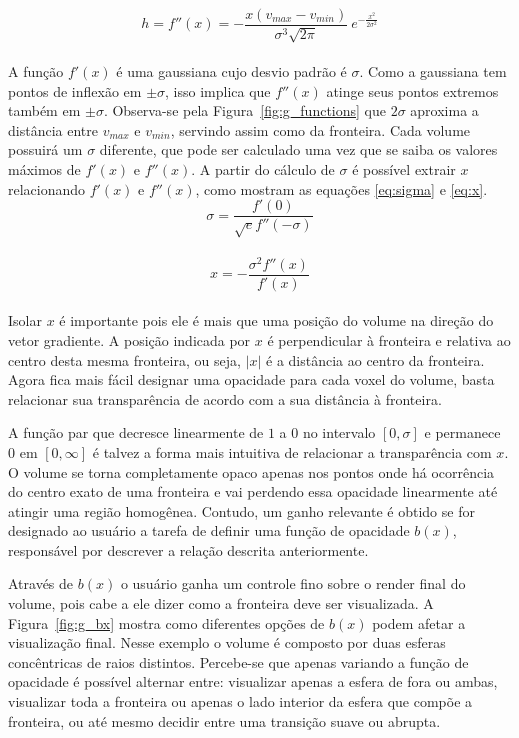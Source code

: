 \begin{equation} \label{eq:second}
	h = f''(x) = -\frac{x(v_{max} - v_{min})}{\sigma^{3}\sqrt{2\pi}}\ e^{-\frac{x^{2}}{2\sigma^{2}}}
\end{equation} \\

	A função $f'(x)$ é uma gaussiana cujo desvio padrão é $\sigma$. Como a gaussiana tem pontos de inflexão em $\pm\sigma$, isso implica que $f''(x)$ atinge seus pontos extremos também em $\pm\sigma$. Observa-se pela Figura~\ref{fig:g_functions} que $2\sigma$ aproxima a distância entre $v_{max}$ e $v_{min}$, servindo assim como  da fronteira. Cada volume possuirá um $\sigma$ diferente, que pode ser calculado uma vez que se saiba os valores máximos de $f'(x)$ e $f''(x)$. A partir do cálculo de $\sigma$ é possível extrair $x$ relacionando $f'(x)$ e $f''(x)$, como mostram as equações \eqref{eq:sigma} e \eqref{eq:x}.
	\\
	
\begin{equation} \label{eq:sigma}
	\sigma = \frac{f'(0)}{\sqrt{e}f''(-\sigma)}
\end{equation} \\

\begin{equation} \label{eq:x}
	x = -\frac{\sigma^{2}f''(x)}{f'(x)}
\end{equation} \\

	Isolar $x$ é importante pois ele é mais que uma posição do volume na direção do vetor gradiente. A posição indicada por $x$ é perpendicular à fronteira e relativa ao centro desta mesma fronteira, ou seja, $|x|$ é a distância ao centro da fronteira. Agora fica mais fácil designar uma opacidade para cada voxel do volume, basta relacionar sua transparência de acordo com a sua distância à fronteira.
	
	A função par que decresce linearmente de $1$ a $0$ no intervalo $[0,\sigma]$ e permanece $0$ em $[0, \infty]$ é talvez a forma mais intuitiva de relacionar a transparência com $x$. O volume se torna completamente opaco apenas nos pontos onde há ocorrência do centro exato de uma fronteira e vai perdendo essa opacidade linearmente até atingir uma região homogênea. Contudo, um ganho relevante é obtido se for designado ao usuário a tarefa de definir uma função de opacidade $b(x)$, responsável por descrever a relação  descrita anteriormente.
	
	Através de $b(x)$ o usuário ganha um controle fino sobre o render final do volume, pois cabe a ele dizer como a fronteira deve ser visualizada. A Figura~\ref{fig:g_bx} mostra como diferentes opções de $b(x)$ podem afetar a visualização final. Nesse exemplo o volume é composto por duas esferas concêntricas de raios distintos. Percebe-se que apenas variando a função de opacidade é possível alternar entre: visualizar apenas a esfera de fora ou ambas, visualizar toda a fronteira ou apenas o lado interior da esfera que compõe a fronteira, ou até mesmo decidir entre uma transição suave ou abrupta.
	
